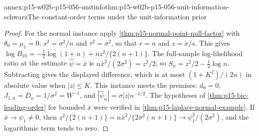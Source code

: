 \begin{annexitem}{annex:p15-w02b-p15-056-unitinfo}{thm:p15-w02b-p15-056-unit-information-schwarz}{The constant-order terms under the unit-information prior}
\begin{proof}
For the normal instance apply \cref{thm:p15-normal-point-null-factor}
with \(\theta_0=\mu_1=0\), \(s^2=\sigma^2/n\) and \(\tau^2=\sigma^2\),
so that \(r=n\) and \(z=\bar x/s\). This gives
\(\log B_{10}=-\tfrac12\log(1+n)+nz^2/\{2(n+1)\}\). The full-sample
log-likelihood ratio at the estimate \(\widehat\psi=\bar x\) is
\(n\bar x^2/(2\sigma^2)=z^2/2\), so \(S_n=z^2/2-\tfrac12\log n\).
Subtracting gives the displayed difference, which is at most
\((1+K^2)/(2n)\) in absolute value when \(|z|\leq K\). This instance
meets the premises: \(d_0=0\), \(J_{1,n}=D_n=1/\sigma^2=W^{-1}\), and
\(|\widehat\psi_n|=\sigma|z|n^{-1/2}\). The hypotheses of
\cref{thm:p15-bic-leading-order} for bounded \(\bar x\) were verified in
\cref{thm:p15-laplace-normal-example}. If \(\bar x\to\psi_1\neq0\), then
\(z^2/\{2(n+1)\}=n\bar x^2/\{2\sigma^2(n+1)\}\to\psi_1^2/(2\sigma^2)\),
and the logarithmic term tends to zero.
\end{proof}
\end{annexitem}

